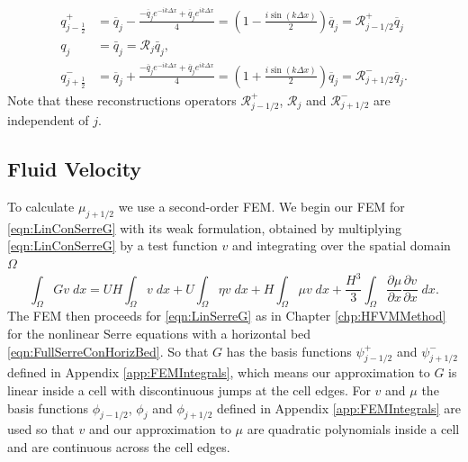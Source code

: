 \begin{subequations}
	\label{eqn:RpmfactorFDVM}
	\begin{align}
	q^+_{j-\frac{1}{2}} &= \overline{q}_j - \frac{- \overline{q}_{j} e^{-ik\Delta x} + \overline{q}_{j} e^{ik\Delta x}}{4} = \left(1  - \frac{i\sin\left(k\Delta x\right)}{2} \right)\overline{q}_{j} = \mathcal{R}^+_{j-1/2}\overline{q}_{j} \\
	q_j &= \bar{q}_j = \mathcal{R}_{j} \bar{q}_j,\\
	q^-_{j+\frac{1}{2}} &=\overline{q}_j + \frac{- \overline{q}_{j} e^{-ik\Delta x} + \overline{q}_{j} e^{ik\Delta x}}{4} = \left(1  + \frac{i\sin\left(k\Delta x\right)}{2} \right)\overline{q}_{j} =\mathcal{R}^-_{j+1/2} \overline{q}_{j}.
	\end{align}
\end{subequations}  
Note that these reconstructions operators $\mathcal{R}^+_{j-1/2}$, $\mathcal{R}_{j}$ and $\mathcal{R}^-_{j+1/2}$ are independent of $j$. 


\subsection{Fluid Velocity}
To calculate $\mu_{j+1/2}$ we use a second-order FEM. We begin our FEM for \eqref{eqn:LinConSerreG} with its weak formulation, obtained by multiplying \eqref{eqn:LinConSerreG} by a test function $v$ and integrating over the spatial domain $\Omega$
\begin{equation*}
\int_{\Omega}G v \; dx = UH\int_{\Omega} v \; dx + U \int_{\Omega} \eta v \; dx +   H\int_{\Omega} \mu v \; dx  + \frac{H^3}{3} \int_{\Omega} \frac{\partial \mu}{\partial x } \frac{\partial v}{\partial x }\; dx.
\end{equation*}
The FEM then proceeds for \eqref{eqn:LinSerreG} as in Chapter \ref{chp:HFVMMethod} for the nonlinear Serre equations with a horizontal bed \eqref{eqn:FullSerreConHorizBed}. So that $G$ has the basis functions $\psi^+_{j - 1/2}$ and $\psi^-_{j + 1/2}$ defined in Appendix \ref{app:FEMIntegrals}, which means our approximation to $G$ is linear inside a cell with discontinuous jumps at the cell edges. For $v$ and $\mu$ the basis functions $\phi_{j-1/2}$, $\phi_{j}$ and $\phi_{j+1/2}$ defined in Appendix \ref{app:FEMIntegrals} are used so that $v$ and our approximation to $\mu$ are quadratic polynomials inside a cell and are continuous across the cell edges.

